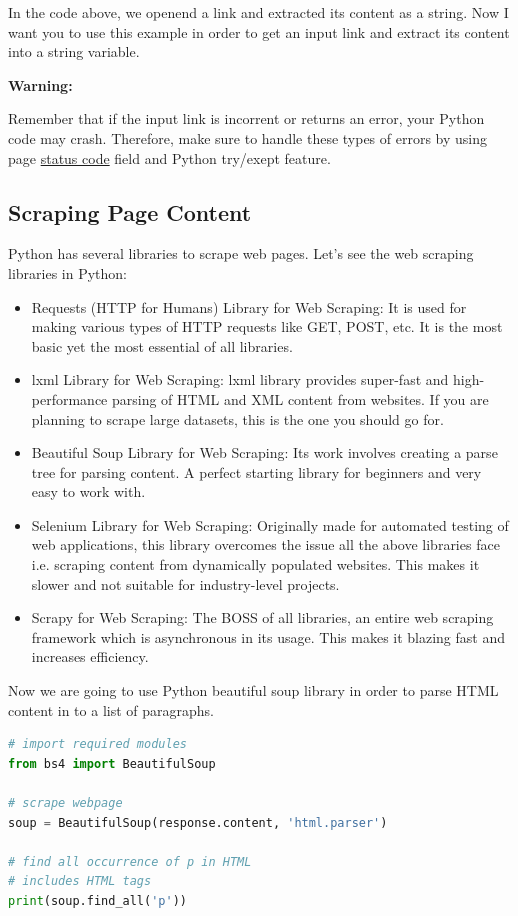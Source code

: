 \documentclass{article}
\newenvironment{warning}{
    \par\medskip
    \noindent
    \begin{minipage}{\linewidth}
    \color{lightred}
    \textbf{Warning:}
}{
    \end{minipage}\par\medskip
}
\begin{document}
In the code above, we openend a link and extracted its content as a string.
Now I want you to use this example in order to get an input link and extract its content into a string variable.

\begin{warning}
Remember that if the input link is incorrent or returns an error, your Python code may crash.
Therefore, make sure to handle these types of errors by using page \underline{status code} field and Python try/exept feature.
\end{warning}

\subsection{Scraping Page Content}
Python has several libraries to scrape web pages. Let's see the web scraping libraries in Python:

\begin{itemize}
    \item Requests (HTTP for Humans) Library for Web Scraping: It is used for making various types of HTTP requests like GET, POST, etc. It is the most basic yet the most essential of all libraries.
    \item lxml Library for Web Scraping: lxml library provides super-fast and high-performance parsing of HTML and XML content from websites. If you are planning to scrape large datasets, this is the one you should go for.
    \item Beautiful Soup Library for Web Scraping: Its work involves creating a parse tree for parsing content. A perfect starting library for beginners and very easy to work with.
    \item Selenium Library for Web Scraping: Originally made for automated testing of web applications, this library overcomes the issue all the above libraries face i.e. scraping content from dynamically populated websites. This makes it slower and not suitable for industry-level projects.
    \item Scrapy for Web Scraping: The BOSS of all libraries, an entire web scraping framework which is asynchronous in its usage. This makes it blazing fast and increases efficiency.
\end{itemize}

Now we are going to use Python beautiful soup library in order to parse HTML content in to a list of paragraphs.

\begin{lstlisting}[language=Python, caption=Example of using BS4 library]
# import required modules
from bs4 import BeautifulSoup

# scrape webpage
soup = BeautifulSoup(response.content, 'html.parser')
 
# find all occurrence of p in HTML
# includes HTML tags
print(soup.find_all('p'))
\end{lstlisting}
\end{document}
